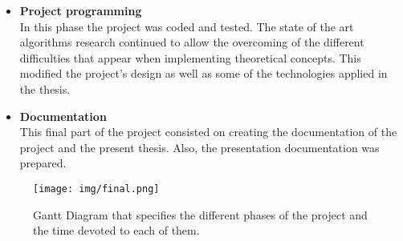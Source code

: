 \begin{itemize}
			 	\item{\textbf{Project programming}}\\
			 	In this phase the project was coded and tested. The state of the art algorithms research continued to allow the overcoming of the different difficulties that appear when implementing theoretical concepts. This modified the project's design as well as some of the technologies applied in the thesis. 

			 	\item{\textbf{Documentation}}\\
			 	This final part of the project consisted on creating the documentation of the project and the present thesis. 
			 	Also, the presentation documentation was prepared. 
			 	\\
		 \end{itemize}

		 \newpage
		\begin{figure}[H]
			\centering
		    \texttt{[image: img/final.png]}
			\caption[Gantt Diagram]{Gantt Diagram that specifies the different phases of the project and the time devoted to each of them. }	
			\label{gantt_diagram}
		\end{figure}
